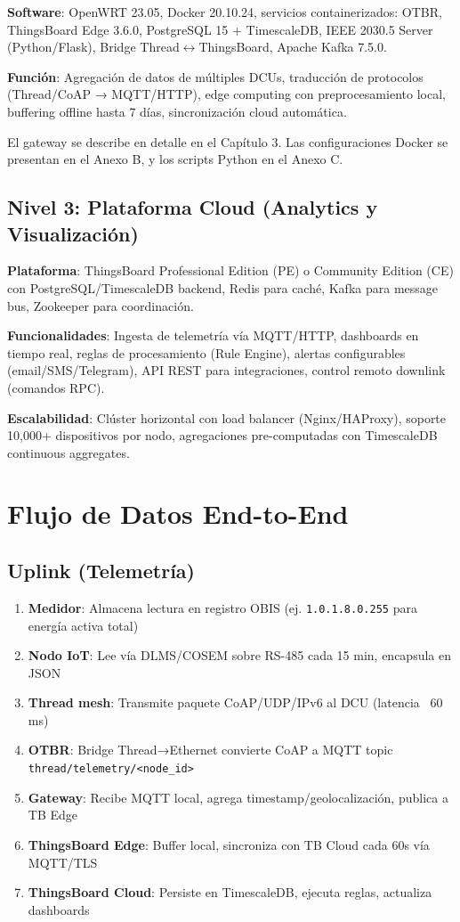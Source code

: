 \textbf{Software}: OpenWRT 23.05, Docker 20.10.24, servicios containerizados: OTBR, ThingsBoard Edge 3.6.0, PostgreSQL 15 + TimescaleDB, IEEE 2030.5 Server (Python/Flask), Bridge Thread$\leftrightarrow$ThingsBoard, Apache Kafka 7.5.0.

\textbf{Función}: Agregación de datos de múltiples DCUs, traducción de protocolos (Thread/CoAP → MQTT/HTTP), edge computing con preprocesamiento local, buffering offline hasta 7 días, sincronización cloud automática.

El gateway se describe en detalle en el Capítulo 3. Las configuraciones Docker se presentan en el Anexo B, y los scripts Python en el Anexo C.

\subsection{Nivel 3: Plataforma Cloud (Analytics y Visualización)}

\textbf{Plataforma}: ThingsBoard Professional Edition (PE) o Community Edition (CE) con PostgreSQL/TimescaleDB backend, Redis para caché, Kafka para message bus, Zookeeper para coordinación.

\textbf{Funcionalidades}: Ingesta de telemetría vía MQTT/HTTP, dashboards en tiempo real, reglas de procesamiento (Rule Engine), alertas configurables (email/SMS/Telegram), API REST para integraciones, control remoto downlink (comandos RPC).

\textbf{Escalabilidad}: Clúster horizontal con load balancer (Nginx/HAProxy), soporte 10,000+ dispositivos por nodo, agregaciones pre-computadas con TimescaleDB continuous aggregates.

\section{Flujo de Datos End-to-End}

\subsection{Uplink (Telemetría)}

\begin{enumerate}
    \item \textbf{Medidor}: Almacena lectura en registro OBIS (ej. \texttt{1.0.1.8.0.255} para energía activa total)
    \item \textbf{Nodo IoT}: Lee vía DLMS/COSEM sobre RS-485 cada 15 min, encapsula en JSON
    \item \textbf{Thread mesh}: Transmite paquete CoAP/UDP/IPv6 al DCU (latencia ~60 ms)
    \item \textbf{OTBR}: Bridge Thread→Ethernet convierte CoAP a MQTT topic \texttt{thread/telemetry/<node\_id>}
    \item \textbf{Gateway}: Recibe MQTT local, agrega timestamp/geolocalización, publica a TB Edge
    \item \textbf{ThingsBoard Edge}: Buffer local, sincroniza con TB Cloud cada 60s vía MQTT/TLS
    \item \textbf{ThingsBoard Cloud}: Persiste en TimescaleDB, ejecuta reglas, actualiza dashboards
\end{enumerate}

